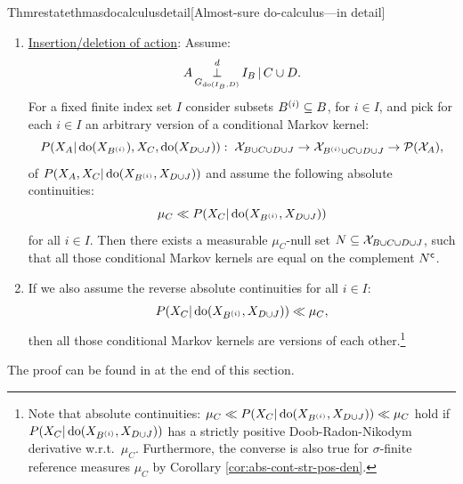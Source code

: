 \begin{restatable}{Thm}{restatethmasdocalculusdetail}[Almost-sure do-calculus---in detail]
\begin{enumerate}
\item \underline{Insertion/deletion of action}: Assume:
            \[ A \operatorname*{\perp}^d_{G_{\operatorname{do}(I_B,D)}} I_B \operatorname*{|} C  \cup D.  \]
            For a fixed finite index set $I$ consider subsets $B^{(i)} \subseteq B$, for $i \in I$, and pick for each $i \in I$ an arbitrary version of a conditional Markov kernel:
            \[ P(X_A|\operatorname{do}(X_{B^{(i)}}),X_C,\operatorname{do}(X_{D\cup J})):\; \mathcal{X}_{B \cup C \cup D \cup J} \to \mathcal{X}_{B^{(i)} \cup C \cup D \cup J} \to \mathcal{P}(\mathcal{X}_A), \]
            of $P(X_A,X_C|\operatorname{do}(X_{B^{(i)}},X_{D\cup J}))$ and assume the following absolute continuities:
            \[ \mu_C \ll  P(X_C|\operatorname{do}(X_{B^{(i)}},X_{D\cup J})) \]
            for all $i \in I$.
            Then there exists a measurable $\mu_C$-null set
        $N \subseteq \mathcal{X}_{B \cup C \cup D \cup J}$,
        such that all those conditional Markov kernels are equal on the complement $N^{\mathsf{c}}$.
    \item[] If we also assume the reverse absolute continuities for all $i \in I$:
        \[ P(X_C|\operatorname{do}(X_{B^{(i)}},X_{D\cup J})) \ll \mu_C, \]
        then all those conditional Markov kernels are versions of each other.\footnote{Note that absolute continuities: $\mu_C \ll P(X_C|\operatorname{do}(X_{B^{(i)}},X_{D\cup J})) \ll \mu_C$ hold if $P(X_C|\operatorname{do}(X_{B^{(i)}},X_{D\cup J}))$ has a strictly positive Doob-Radon-Nikodym derivative w.r.t.\ $\mu_C$. Furthermore, the converse is also true for $\sigma$-finite reference measures $\mu_C$ by Corollary \ref{cor:abs-cont-str-pos-den}.}
\end{enumerate}
\end{restatable}
The proof can be found in at the end of this section.

